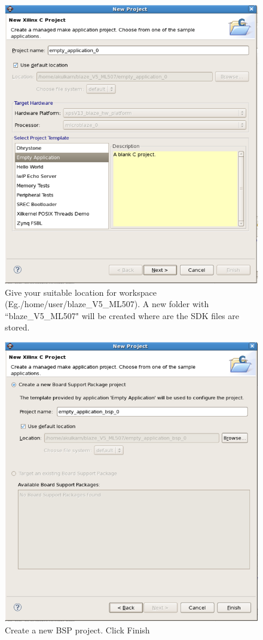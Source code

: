 \documentclass[a4paper,oneside]{memoir}
\begin{document}
\begin{itemize}
\begin{figure}[H]
\centering
\includegraphics[scale=0.5]{softwarestep4}
\caption{Give your suitable location for workspace (Eg./home/user/blaze\_V5\_ML507). A new folder with ``blaze\_V5\_ML507" will be created where are the SDK files are stored.  \label{fig:softwarestep4}}
\end{figure}
\begin{figure}[H]
\centering
\includegraphics[scale=0.5]{softwarestep5}
\caption{Create a new BSP project. Click Finish \label{fig:softwarestep5}}
\end{figure}


\end{itemize}
\end{document}
